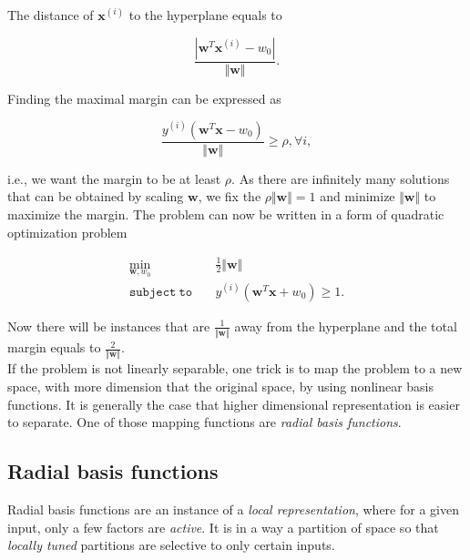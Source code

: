 The distance of $\mathbf{x}^{(i)}$ to the hyperplane equals to 

\begin{equation}
	\frac{ | \mathbf{w}^T\mathbf{x}^{(i)} - w_0 | }{ \Vert \mathbf{w} \Vert}.
\end{equation}

Finding the maximal margin can be expressed as

\begin{equation}
	\frac{y^{(i)}(\mathbf{w}^T\mathbf{x} - w_0)}{\Vert \mathbf{w} \Vert} \geq \rho, \forall i,
\end{equation}

i.e., we want the margin to be at least $\rho$. As there are infinitely many solutions that can be obtained by scaling $\mathbf{w}$, we fix the $\rho \Vert \mathbf{w} \Vert = 1$ and minimize $\Vert \mathbf{w} \Vert$ to maximize the margin. The problem can now be written in a form of quadratic optimization problem

\begin{align*}
	\min_{\mathbf{w}, w_0} & \quad \frac{1}{2} \Vert \mathbf{w} \Vert \\
	\mathtt{subject \ to} & \quad  y^{(i)} \left ( \mathbf{w}^T\mathbf{x} + w_0  \right ) \geq 1.
\end{align*}

Now there will be instances that are $\frac{1}{\Vert \mathbf{w} \Vert}$ away from the hyperplane and the total margin equals to $\frac{2}{\Vert \mathbf{w} \Vert}$. \\

If the problem is not linearly separable, one trick is to map the problem to a new space, with more dimension that the original space, by using nonlinear basis functions. It is generally the case that higher dimensional representation is easier to separate. One of those mapping functions are \textit{radial basis functions}. 


 
\subsection{Radial basis functions}

Radial basis functions are an instance of a \textit{local representation}, where for a given input, only a few factors are \textit{active}. It is in a way a partition of space so that \textit{locally tuned} partitions are selective to only certain inputs. \\

